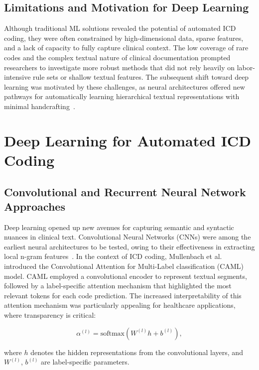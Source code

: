 \subsection{Limitations and Motivation for Deep Learning}

Although traditional ML solutions revealed the potential of automated ICD coding, they were often constrained by high-dimensional data, sparse features, and a lack of capacity to fully capture clinical context. The low coverage of rare codes and the complex textual nature of clinical documentation prompted researchers to investigate more robust methods that did not rely heavily on labor-intensive rule sets or shallow textual features. The subsequent shift toward deep learning was motivated by these challenges, as neural architectures offered new pathways for automatically learning hierarchical textual representations with minimal handcrafting~\citep{lecun2015deep}.

\section{Deep Learning for Automated ICD Coding}

\subsection{Convolutional and Recurrent Neural Network Approaches}

Deep learning opened up new avenues for capturing semantic and syntactic nuances in clinical text. Convolutional Neural Networks (CNNs) were among the earliest neural architectures to be tested, owing to their effectiveness in extracting local n-gram features~\citep{kim2014convolutional}. In the context of ICD coding, Mullenbach et al.~\citep{mullenbach2018explainable} introduced the Convolutional Attention for Multi-Label classification (CAML) model. CAML employed a convolutional encoder to represent textual segments, followed by a label-specific attention mechanism that highlighted the most relevant tokens for each code prediction. The increased interpretability of this attention mechanism was particularly appealing for healthcare applications, where transparency is critical:

\begin{equation}
\alpha^{(l)} = \mathrm{softmax}(W^{(l)} h + b^{(l)}),
\end{equation}

where \(h\) denotes the hidden representations from the convolutional layers, and \(W^{(l)}\), \(b^{(l)}\) are label-specific parameters.

